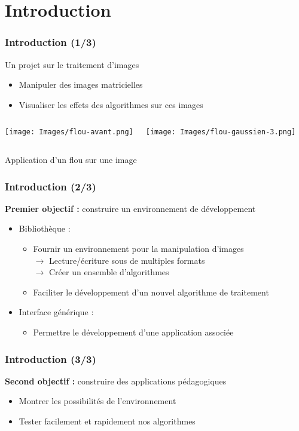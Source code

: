 \section*{Introduction}

\begin{frame}
	\frametitle{Introduction (1/3)}
     
    Un projet sur le traitement d'images
    \begin{itemize}
    	\item Manipuler des images matricielles
    	\item Visualiser les effets des algorithmes sur ces images
    \end{itemize}
	\begin{columns}[c]
		\column{1in}
			\begin{center}
				\texttt{[image: Images/flou-avant.png]}
			\end{center}
		\column{1in}
			\begin{center}
				\texttt{[image: Images/flou-gaussien-3.png]}
			\end{center}
	\end{columns}
	\begin{center}
		\scriptsize
			Application d'un flou sur une image
	\end{center}
\end{frame}

\begin{frame}
	\frametitle{Introduction (2/3)}
	
	\textbf{Premier objectif :} construire un environnement de développement
	\begin{itemize}
		\item Bibliothèque  :
		\begin{itemize}
		    \item Fournir un environnement pour la manipulation d'images \\
			$\longrightarrow$ Lecture/écriture sous de multiples formats \\
			$\longrightarrow$ Créer un ensemble d'algorithmes \\
		    \item Faciliter le développement d'un nouvel algorithme de traitement
		\end{itemize}
		\item Interface générique :
		\begin{itemize}
		    \item Permettre le développement d'une application associée
		\end{itemize}
	\end{itemize}
\end{frame}

\begin{frame}
	\frametitle{Introduction (3/3)}
	
	\textbf{Second objectif :} construire des applications pédagogiques\\

	\begin{itemize}
		\item Montrer les possibilités de l'environnement
		\item Tester facilement et rapidement nos algorithmes
	\end{itemize}
\end{frame}
